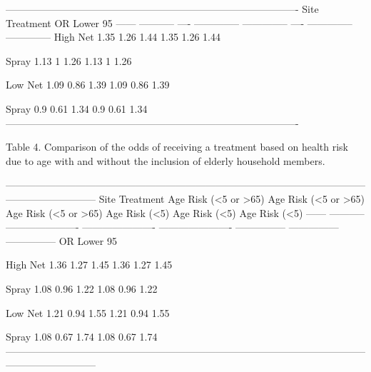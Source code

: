 \documentclass{article}\usepackage[]{graphicx}\usepackage[]{color}
\begin{document}
----------------------------------------------------------------------------------------
 Site   Treatment   OR   Lower 95%
------ ----------- ---- -------------- -------------- ---- -------------- --------------
 High      Net     1.35      1.26           1.44      1.35      1.26           1.44     

          Spray    1.13       1             1.26      1.13       1             1.26     

 Low       Net     1.09      0.86           1.39      1.09      0.86           1.39     

          Spray    0.9       0.61           1.34      0.9       0.61           1.34     
----------------------------------------------------------------------------------------





Table 4.  Comparison of the odds of receiving a treatment based on health risk due to age with and without the inclusion of elderly household members. 

---------------------------------------------------------------------------------------------------------------------------------------
 Site   Treatment   Age Risk (<5 or >65)   Age Risk (<5 or >65)   Age Risk (<5 or >65)   Age Risk (<5)   Age Risk (<5)   Age Risk (<5) 
------ ----------- ---------------------- ---------------------- ---------------------- --------------- --------------- ---------------
                             OR                Lower 95%

 High      Net              1.36                   1.27                   1.45               1.36            1.27            1.45      

          Spray             1.08                   0.96                   1.22               1.08            0.96            1.22      

 Low       Net              1.21                   0.94                   1.55               1.21            0.94            1.55      

          Spray             1.08                   0.67                   1.74               1.08            0.67            1.74      
---------------------------------------------------------------------------------------------------------------------------------------
\end{document}
